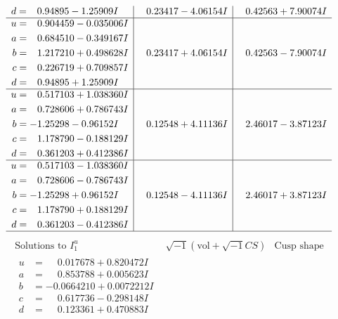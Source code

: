 \documentclass[1p]{elsarticle_modified}
\theoremstyle{definition}
\newcommand{\I}{\sqrt{-1}}
\begin{document}
$$\begin{array}{c|c|c}
\begin{aligned}
d &= \phantom{-}0.94895 - 1.25909 I\end{aligned}
 & \phantom{-}0.23417 - 4.06154 I & \phantom{-}0.42563 + 7.90074 I \\ \hline\begin{aligned}
u &= \phantom{-}0.904459 - 0.035006 I \\
a &= \phantom{-}0.684510 - 0.349167 I \\
b &= \phantom{-}1.217210 + 0.498628 I \\
c &= \phantom{-}0.226719 + 0.709857 I \\
d &= \phantom{-}0.94895 + 1.25909 I\end{aligned}
 & \phantom{-}0.23417 + 4.06154 I & \phantom{-}0.42563 - 7.90074 I \\ \hline\begin{aligned}
u &= \phantom{-}0.517103 + 1.038360 I \\
a &= \phantom{-}0.728606 + 0.786743 I \\
b &= -1.25298 - 0.96152 I \\
c &= \phantom{-}1.178790 - 0.188129 I \\
d &= \phantom{-}0.361203 + 0.412386 I\end{aligned}
 & \phantom{-}0.12548 + 4.11136 I & \phantom{-}2.46017 - 3.87123 I \\ \hline\begin{aligned}
u &= \phantom{-}0.517103 - 1.038360 I \\
a &= \phantom{-}0.728606 - 0.786743 I \\
b &= -1.25298 + 0.96152 I \\
c &= \phantom{-}1.178790 + 0.188129 I \\
d &= \phantom{-}0.361203 - 0.412386 I\end{aligned}
 & \phantom{-}0.12548 - 4.11136 I & \phantom{-}2.46017 + 3.87123 I\\
 \hline 
 \end{array}$$\newpage$$\begin{array}{c|c|c}  
\text{Solutions to }I^u_{1}& \I (\text{vol} + \sqrt{-1}CS) & \text{Cusp shape}\\
 \hline 
\begin{aligned}
u &= \phantom{-}0.017678 + 0.820472 I \\
a &= \phantom{-}0.853788 + 0.005623 I \\
b &= -0.0664210 + 0.0072212 I \\
c &= \phantom{-}0.617736 - 0.298148 I \\
d &= \phantom{-}0.123361 + 0.470883 I\end{aligned}

\end{array}$$
\end{document}

